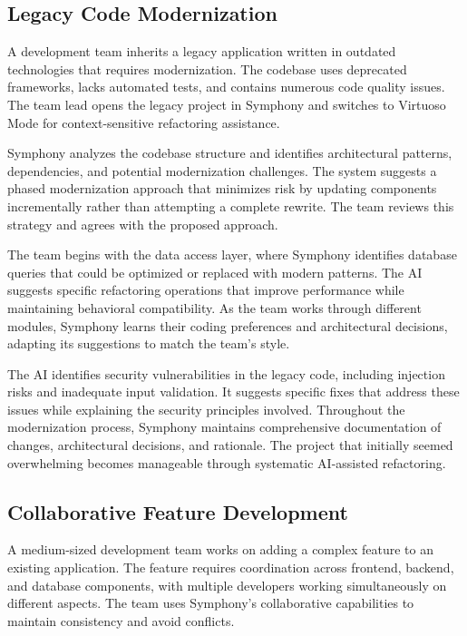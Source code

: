 \subsection{Legacy Code Modernization}
\label{subsec:legacy-modernization}

A development team inherits a legacy application written in outdated technologies that requires modernization. The codebase uses deprecated frameworks, lacks automated tests, and contains numerous code quality issues. The team lead opens the legacy project in Symphony and switches to Virtuoso Mode for context-sensitive refactoring assistance.

Symphony analyzes the codebase structure and identifies architectural patterns, dependencies, and potential modernization challenges. The system suggests a phased modernization approach that minimizes risk by updating components incrementally rather than attempting a complete rewrite. The team reviews this strategy and agrees with the proposed approach.

The team begins with the data access layer, where Symphony identifies database queries that could be optimized or replaced with modern patterns. The AI suggests specific refactoring operations that improve performance while maintaining behavioral compatibility. As the team works through different modules, Symphony learns their coding preferences and architectural decisions, adapting its suggestions to match the team's style.

The AI identifies security vulnerabilities in the legacy code, including injection risks and inadequate input validation. It suggests specific fixes that address these issues while explaining the security principles involved. Throughout the modernization process, Symphony maintains comprehensive documentation of changes, architectural decisions, and rationale. The project that initially seemed overwhelming becomes manageable through systematic AI-assisted refactoring.

\subsection{Collaborative Feature Development}
\label{subsec:collaborative-development}

A medium-sized development team works on adding a complex feature to an existing application. The feature requires coordination across frontend, backend, and database components, with multiple developers working simultaneously on different aspects. The team uses Symphony's collaborative capabilities to maintain consistency and avoid conflicts.

